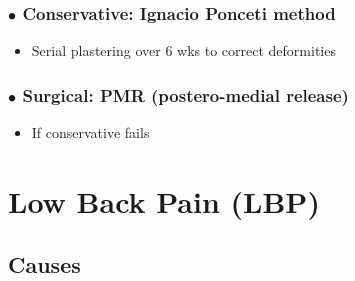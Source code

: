 \documentclass[
  12pt,
]{memoir}
\providecommand{\tightlist}{%
  \setlength{\itemsep}{0pt}\setlength{\parskip}{0pt}}
\begin{document}
\hypertarget{bullet-conservative-ignacio-ponceti-method}{%
\subsubsection{\texorpdfstring{\(\bullet\) Conservative: Ignacio Ponceti
method}{\textbackslash bullet Conservative: Ignacio Ponceti method}}\label{bullet-conservative-ignacio-ponceti-method}}

\begin{itemize}
\tightlist
\item
  Serial plastering over 6 wks to correct deformities
\end{itemize}

\hypertarget{bullet-surgical-pmr-postero-medial-release}{%
\subsubsection{\texorpdfstring{\(\bullet\) Surgical: PMR (postero-medial
release)}{\textbackslash bullet Surgical: PMR (postero-medial release)}}\label{bullet-surgical-pmr-postero-medial-release}}

\begin{itemize}
\tightlist
\item
  If conservative fails
\end{itemize}

\pagebreak

\hypertarget{low-back-pain-lbp}{%
\section{Low Back Pain (LBP)}\label{low-back-pain-lbp}}

\hypertarget{causes}{%
\subsection{Causes}\label{causes}}
\end{document}
